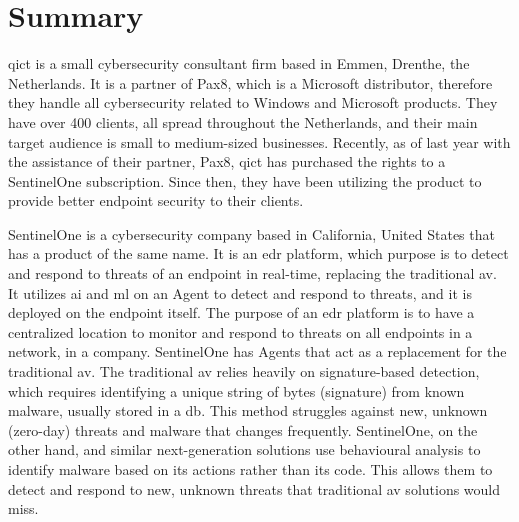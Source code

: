 \chapter*{Summary}


\acrshort{qict} is a small cybersecurity consultant firm based in Emmen, Drenthe, the Netherlands. It is a partner of Pax8,
which is a Microsoft distributor, therefore they handle all cybersecurity related to Windows and Microsoft products. They
have over 400 clients, all spread throughout the Netherlands, and their main target audience is small to medium-sized
businesses. Recently, as of last year with the assistance of their partner, Pax8, \acrshort{qict} has purchased the rights
to a SentinelOne subscription. Since then, they have been utilizing the product to provide better endpoint security to their clients.

SentinelOne is a cybersecurity company based in California, United States that has a product of the same name. It is an
\acrshort{edr} platform, which purpose is to detect and respond to threats of an endpoint in real-time, replacing the
traditional \acrshort{av}. It utilizes \acrshort{ai} and \acrshort{ml} on an Agent to detect and respond to threats, and it is
deployed on the endpoint itself. The purpose of an \acrshort{edr} platform is to have a centralized location to monitor and
respond to threats on all endpoints in a network, in a company. SentinelOne has Agents that act as a replacement for the
traditional \acrshort{av}. The traditional \acrshort{av} relies heavily on signature-based detection, which requires
identifying a unique string of bytes (signature) from known malware, usually stored in a \acrshort{db}. This method
struggles against new, unknown (zero-day) threats and malware that changes frequently. SentinelOne, on the other hand,
and similar next-generation solutions use behavioural analysis to identify malware based on its actions rather than its code.
This allows them to detect and respond to new, unknown threats that traditional \acrshort{av} solutions would miss.

